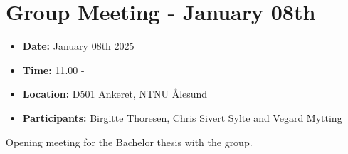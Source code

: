\section*{Group Meeting - January 08th}
\begin{itemize}
    \item \textbf{Date:} January 08th 2025
    \item \textbf{Time:} 11.00 -
    \item \textbf{Location:} D501 Ankeret, NTNU Ålesund
    \item \textbf{Participants:} Birgitte Thoresen, Chris Sivert Sylte and Vegard Mytting
\end{itemize}


Opening meeting for the Bachelor thesis with the group. 